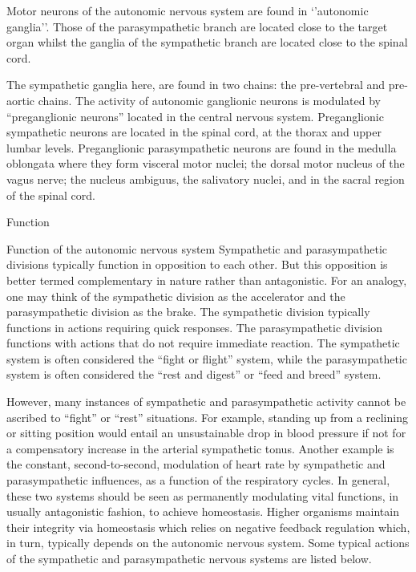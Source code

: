Motor neurons of the autonomic nervous system are found in `'autonomic ganglia''. Those of the parasympathetic branch are located close to the target organ whilst the ganglia of the sympathetic branch are located close to the spinal cord.

The sympathetic ganglia here, are found in two chains: the pre-vertebral and pre-aortic chains. The activity of autonomic ganglionic neurons is modulated by ``preganglionic neurons'' located in the central nervous system. Preganglionic sympathetic neurons are located in the spinal cord, at the thorax and upper lumbar levels. Preganglionic parasympathetic neurons are found in the medulla oblongata where they form visceral motor nuclei; the dorsal motor nucleus of the vagus nerve; the nucleus ambiguus, the salivatory nuclei, and in the sacral region of the spinal cord.

Function

Function of the autonomic nervous system
Sympathetic and parasympathetic divisions typically function in opposition to each other. But this opposition is better termed complementary in nature rather than antagonistic. For an analogy, one may think of the sympathetic division as the accelerator and the parasympathetic division as the brake. The sympathetic division typically functions in actions requiring quick responses. The parasympathetic division functions with actions that do not require immediate reaction. The sympathetic system is often considered the ``fight or flight'' system, while the parasympathetic system is often considered the ``rest and digest'' or ``feed and breed'' system.

However, many instances of sympathetic and parasympathetic activity cannot be ascribed to ``fight'' or ``rest'' situations. For example, standing up from a reclining or sitting position would entail an unsustainable drop in blood pressure if not for a compensatory increase in the arterial sympathetic tonus. Another example is the constant, second-to-second, modulation of heart rate by sympathetic and parasympathetic influences, as a function of the respiratory cycles. In general, these two systems should be seen as permanently modulating vital functions, in usually antagonistic fashion, to achieve homeostasis. Higher organisms maintain their integrity via homeostasis which relies on negative feedback regulation which, in turn, typically depends on the autonomic nervous system. Some typical actions of the sympathetic and parasympathetic nervous systems are listed below.

